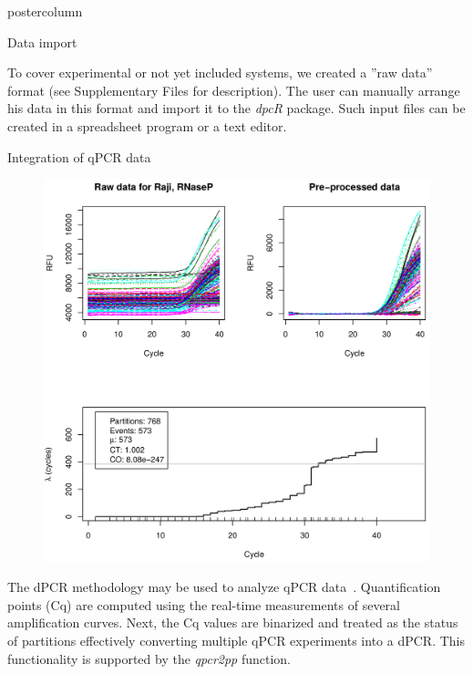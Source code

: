 \documentclass[final]{beamer}\usepackage[]{graphicx}\usepackage[]{color}
\begin{document}
\begin{frame}
\begin{columns}
\begin{column}{.46\textwidth}
\begin{beamercolorbox}[center,wd=\textwidth]{postercolumn}
\begin{minipage}[T]{.95\textwidth}
{\begin{block}{Data import}
\smallskip

To cover experimental or not yet included systems, we 
created a ''raw data'' format (see Supplementary Files for description). The 
user can manually arrange his data in this format and import it to the 
\textit{dpcR} package. Such input files can be created in a spreadsheet program 
or a text editor.

    \end{block}
    \vfill
    
    \begin{block}{Integration of qPCR data}
          \begin{figure}
\begin{center}
\includegraphics[width=0.8\columnwidth]{figures/qpcr2pp_1.png}
\end{center}
\label{workflow}
\end{figure}
    
    The dPCR methodology may be used to analyze qPCR data~\citep{mojtahedi_2014}.
    Quantification points (Cq) are computed using the real-time measurements of 
    several amplification curves. Next, the Cq values are binarized and treated as 
    the status of partitions effectively converting multiple qPCR experiments into a 
    dPCR. This functionality is supported by the \textit{qpcr2pp} function.
    \end{block}
    \vfill
            }
        \end{minipage}
      \end{beamercolorbox}
    \end{column}
    

\end{columns}
\end{frame}
\end{document}
